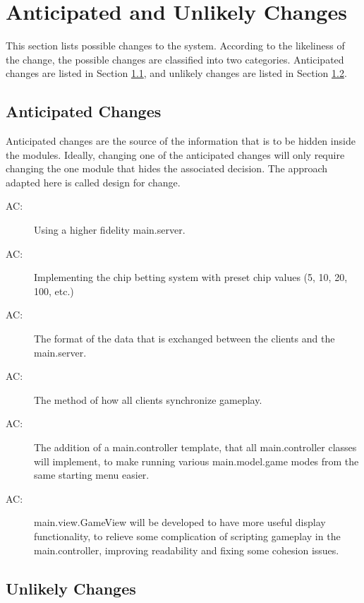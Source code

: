 \documentclass[12pt, titlepage]{article}
\newcounter{acnum}
\newcommand{\actheacnum}{AC\theacnum}
\begin{document}
\section{Anticipated and Unlikely Changes} \label{SecChange}

This section lists possible changes to the system. According to the likeliness
of the change, the possible changes are classified into two
categories. Anticipated changes are listed in Section \ref{SecAchange}, and
unlikely changes are listed in Section \ref{SecUchange}.

\subsection{Anticipated Changes} \label{SecAchange}

Anticipated changes are the source of the information that is to be hidden
inside the modules. Ideally, changing one of the anticipated changes will only
require changing the one module that hides the associated decision. The approach
adapted here is called design for
change.

\begin{description}
\item[ \actheacnum \label{acHardware}:] Using a higher fidelity main.server.
\item[ \actheacnum \label{acInput}:] Implementing the chip betting system with preset chip values (5, 10, 20, 100, etc.)
\item[ \actheacnum \label{acData}:] The format of the data that is exchanged between the clients and the main.server.
\item[ \actheacnum \label{acSync}:] The method of how all clients synchronize gameplay.
\item[ \actheacnum \label{acSync}:] The addition of a main.controller template, that all main.controller classes will implement, to make running various main.model.game modes from the same starting menu easier.
\item[ \actheacnum \label{acSync}:] main.view.GameView will be developed to have more useful display functionality, to relieve some complication of scripting gameplay in the main.controller, improving readability and fixing some cohesion issues.
\end{description}

\subsection{Unlikely Changes} \label{SecUchange}
\end{document}
